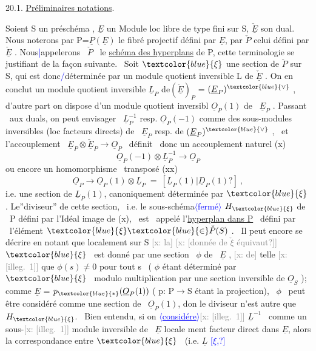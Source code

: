 \documentclass[11pt]{article}
\newcommand{\hand}[1]{\textcolor{blue}{#1}}
\let\over\relax
\newcommand{\over}[2]{\textcolor{gray}{#1}\textcolor{blue}{\ensuremath{^{\!\nearrow}}#2}}
\newcommand{\inserted}[2][]{\textcolor{blue}{$\langle$#2$\rangle$}}
\newcommand{\xout}[1]{\textcolor{gray}{[\textsf{x:} #1]}}
\newcommand{\uline}[1]{\underline{#1}}
\newcommand{\unsure}[1]{[#1?]}
\newcommand{\illegible}[1]{[\textsf{illeg.\ #1}]}
\begin{document}
20.1. \quad \uline{Préliminaires \over{de}{\unsure{et}} notations}.

Soient S un \quad préschéma , $\underline{E}$ un Module loc libre de type fini sur S,
$\check{\underline{E}}$ son dual. Nous noterons par P=$\underline{P}(\underline{E})$ le fibré projectif défini par $\underline{E}$,
par $\check{P}$ celui défini par $\check{\underline{E}}$ . Nous\hand{|}appelerons \ $\check{P}$ \ le \uline{schéma des hyperplans}
de P, cette terminologie se justifiant de la façon suivante. \ Soit
$\hand{\xi}$ une section de $\check{P}$ sur S, qui est donc\hand{/}déterminée par un module quotient
inversible L de $\check{\underline{E}}$ . On en conclut un module quotient inversible
$\underline{L}_P$ de$(\check{\underline{E}})_P$ = $(\underline{E}_P)^{\hand{\vee}}$ , d'autre part on dispose d'un module quotient inversibl
$\underline{O}_P(1)$ de \ $\underline{E}_P$ . Passant \ aux duals, on peut envisager \ $\underline{L}_P^{-1}$ resp. $\underline{O}_P(-1)$
comme des sous-modules inversibles (loc facteurs directs) de \ $\underline{E}_P$ resp.
de $(\underline{E}_P)^{\hand{\vee}}$ , \ et l'accouplement \ $\underline{E}_P \otimes \check{\underline{E}}_P \longrightarrow \underline{O}_P$ \ définit \ donc un
accouplement naturel
(x) \[ \underline{O}_P(-1)\otimes\underline{L}_P^{-1} \to \underline{O}_P \]
ou encore un homomorphisme \ transposé
(xx) \[ \underline{O}_P \longrightarrow \underline{O}_P(1)\otimes\underline{L}_P \ = \ \unsure{\underline{L}_P(1)|\underline{D}_P(1)} \ , \]
i.e. une section de $\underline{L}_P(1)$, canoniquement déterminée par $\hand{\xi}$ . Le''diviseur''
de cette section, \ i.e. le sous-schéma\inserted{fermé} $H_{\hand{\xi}}$ de \ P défini par l'Idéal
image de (x), \ est \ appelé l'\uline{hyperplan dans P} \ défini par \ l'élément
$\hand{\xi} \hand{\in} \check{P}(S)$ . \ Il peut encore se décrire en notant que localement sur S \xout{la}
\xout{\unsure{donnée de $\check{\xi}$ équivaut}} \quad $\hand{\xi}$ \ est donné par une section \ $\phi$ de \ $\underline{E}$ , \xout{de} telle
\xout{\illegible{1}} que $\phi(s) \neq 0$ pour tout s \ ( $\phi$ étant déterminé par $\hand{\xi}$ \ modulo
multiplication par une section inversible de $\underline{O}_S$ ); comme $\underline{E}$ = $p_{\hand{*}}(\underline{O}_P(1))$
( p: P$\to$S étant la projection), \ $\phi$ \ peut être considéré comme une section
de \ $\underline{O}_P(1)$, don\over{c}{t} le diviseur n'est autre que $H_{\hand{\xi}}$. \ Bien entendu, si on
\inserted[typed]{\uline{considére}}\xout{\illegible{1}} $\underline{L}^{-1}$ \ comme un sous-\xout{\illegible{1}} module inversible de \ $\underline{E}$ locale
ment facteur direct dans $\underline{E}$, alors la correspondance entre $\hand{\xi}$ \ (i.e. $\underline{L}$ \hand{\unsure{$\xi$,}}
\end{document}
